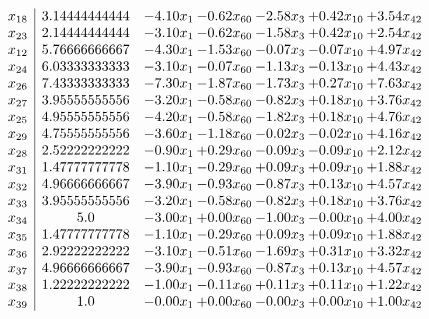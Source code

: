 \documentclass[8pt]{article}
\begin{document}
\[\begin{array}{c| c c@{\hskip 2pt} c@{\hskip 2pt} c@{\hskip 2pt} c@{\hskip 2pt} c@{\hskip 2pt} }
 x_{18}   &  3.14444444444 & -4.10 x_{1} & -0.62 x_{60} & -2.58 x_{3} & +  0.42 x_{10} & +  3.54 x_{42}\\
 x_{23}   &  2.14444444444 & -3.10 x_{1} & -0.62 x_{60} & -1.58 x_{3} & +  0.42 x_{10} & +  2.54 x_{42}\\
 x_{12}   &  5.76666666667 & -4.30 x_{1} & -1.53 x_{60} & -0.07 x_{3} & -0.07 x_{10} & +  4.97 x_{42}\\
 x_{24}   &  6.03333333333 & -3.10 x_{1} & -0.07 x_{60} & -1.13 x_{3} & -0.13 x_{10} & +  4.43 x_{42}\\
 x_{26}   &  7.43333333333 & -7.30 x_{1} & -1.87 x_{60} & -1.73 x_{3} & +  0.27 x_{10} & +  7.63 x_{42}\\
 x_{27}   &  3.95555555556 & -3.20 x_{1} & -0.58 x_{60} & -0.82 x_{3} & +  0.18 x_{10} & +  3.76 x_{42}\\
 x_{25}   &  4.95555555556 & -4.20 x_{1} & -0.58 x_{60} & -1.82 x_{3} & +  0.18 x_{10} & +  4.76 x_{42}\\
 x_{29}   &  4.75555555556 & -3.60 x_{1} & -1.18 x_{60} & -0.02 x_{3} & -0.02 x_{10} & +  4.16 x_{42}\\
 x_{28}   &  2.52222222222 & -0.90 x_{1} & +  0.29 x_{60} & -0.09 x_{3} & -0.09 x_{10} & +  2.12 x_{42}\\
 x_{31}   &  1.47777777778 & -1.10 x_{1} & -0.29 x_{60} & +  0.09 x_{3} & +  0.09 x_{10} & +  1.88 x_{42}\\
 x_{32}   &  4.96666666667 & -3.90 x_{1} & -0.93 x_{60} & -0.87 x_{3} & +  0.13 x_{10} & +  4.57 x_{42}\\
 x_{33}   &  3.95555555556 & -3.20 x_{1} & -0.58 x_{60} & -0.82 x_{3} & +  0.18 x_{10} & +  3.76 x_{42}\\
 x_{34}   &  5.0 & -3.00 x_{1} & +  0.00 x_{60} & -1.00 x_{3} & -0.00 x_{10} & +  4.00 x_{42}\\
 x_{35}   &  1.47777777778 & -1.10 x_{1} & -0.29 x_{60} & +  0.09 x_{3} & +  0.09 x_{10} & +  1.88 x_{42}\\
 x_{36}   &  2.92222222222 & -3.10 x_{1} & -0.51 x_{60} & -1.69 x_{3} & +  0.31 x_{10} & +  3.32 x_{42}\\
 x_{37}   &  4.96666666667 & -3.90 x_{1} & -0.93 x_{60} & -0.87 x_{3} & +  0.13 x_{10} & +  4.57 x_{42}\\
 x_{38}   &  1.22222222222 & -1.00 x_{1} & -0.11 x_{60} & +  0.11 x_{3} & +  0.11 x_{10} & +  1.22 x_{42}\\
 x_{39}   &  1.0 & -0.00 x_{1} & +  0.00 x_{60} & -0.00 x_{3} & +  0.00 x_{10} & +  1.00 x_{42}\\

\end{array}\]
\end{document}
